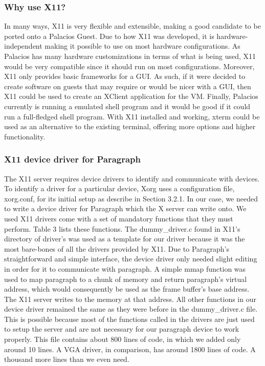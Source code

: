 \documentclass{acm_proc_article-sp}
\begin{document}
\subsubsection{Why use X11?}
In many ways, X11 is very flexible and extensible, making a good candidate to be ported onto a Palacios Guest. Due to how X11 was developed, it is hardware-independent making it possible to use on most hardware configurations. As Palacios has many hardware customizations in terms of what is being used, X11 would be very compatible since it should run on most configurations. Moreover, X11 only provides basic frameworks for a GUI. As such, if it were decided to create software on guests that may require or would be nicer with a GUI, then X11 could be used to create an XClient application for the VM. Finally, Palacios currently is running a emulated shell program and it would be good if it could run a full-fledged shell program. With X11 installed and working, xterm could be used as an alternative to the existing terminal, offering more options and higher functionality. 

\subsubsection{X11 device driver for Paragraph}
The X11 server requires device drivers to identify and communicate with devices.
To identify a driver for a particular device, Xorg uses a configuration file, xorg.conf, for its initial setup as describe in Section 3.2.1. 
In our case, we needed to write a device driver for Paragraph which the X server can
write onto. We used 
X11 drivers come with a set of mandatory functions that they must perform. Table
3 lists these functions.
The dummy\_driver.c found in X11's directory of driver's was used as a template for our driver because it was the most
bare-bones of all the drivers provided by X11. 
Due to Paragraph's straightforward and simple interface, the device driver only
needed slight editing in order for it to communicate with paragraph. A simple
mmap function was used to map paragraph to a chunk of memory and return
paragraph's virtual address, which would consequently be used as the frame
buffer's base address. The X11 server writes to the memory at that address.
All other functions in our device driver remained the same as they were before in the dummy\_driver.c file. 
This is possible because most of the functions called in the drivers are just used to setup the server and are not 
necessary for our paragraph device to work properly. This file contains about 800 lines of code, in which we added only around 10 lines.
A VGA driver, in comparison, has around 1800 lines of code. A thousand more lines than we even need. 
\end{document}

